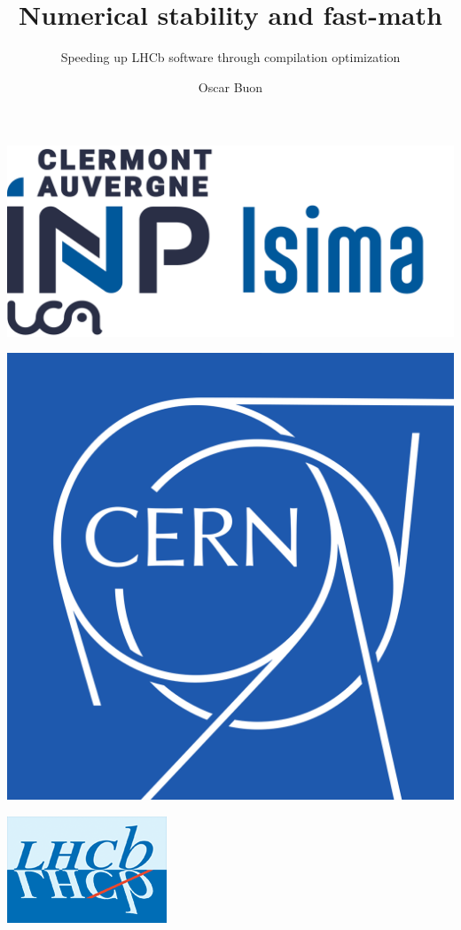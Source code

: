 \documentclass{beamer}
\title{Numerical stability and fast-math}
\subtitle{Speeding up LHCb software through compilation optimization}
\author{Oscar Buon}
\begin{document}
\begin{frame}
    \centering
    \begin{minipage}{0.2\textwidth}
        \includegraphics[width=\textwidth]{logo_ISIMA_INP.png}
    \end{minipage}\hfill
    \begin{minipage}{0.2\textwidth}
        \includegraphics[width=\textwidth]{logo_CERN.png}
    \end{minipage}\hfill
    \begin{minipage}{0.2\textwidth}
        \includegraphics[width=\textwidth]{logo_LHCb.png}
    \end{minipage}


\end{frame}
\end{document}
